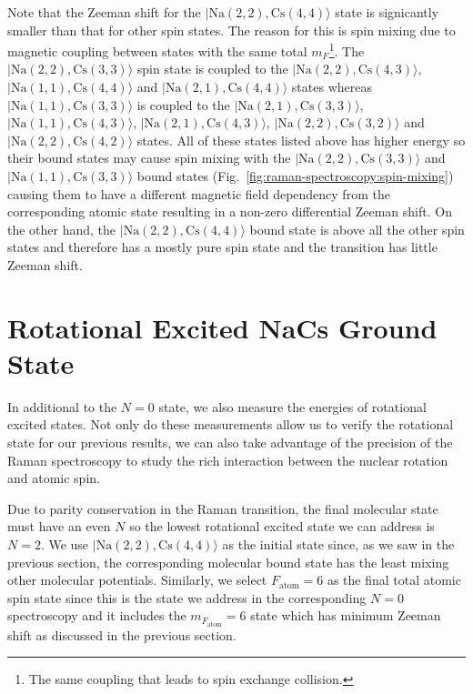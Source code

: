 Note that the Zeeman shift for the $|\mathrm{Na(2, 2),Cs(4, 4)}\rangle$ state
is signicantly smaller than that for other spin states.
The reason for this is spin mixing due to magnetic coupling between states
with the same total $m_F$\footnote{The same coupling that leads to spin exchange collision.}.
The $|\mathrm{Na(2, 2),Cs(3, 3)}\rangle$ spin state is coupled to the
$|\mathrm{Na(2, 2),Cs(4, 3)}\rangle$, $|\mathrm{Na(1, 1),Cs(4, 4)}\rangle$
and $|\mathrm{Na(2, 1),Cs(4, 4)}\rangle$ states
whereas $|\mathrm{Na(1, 1),Cs(3, 3)}\rangle$ is coupled to the
$|\mathrm{Na(2, 1),Cs(3, 3)}\rangle$, $|\mathrm{Na(1, 1),Cs(4, 3)}\rangle$,
$|\mathrm{Na(2, 1),Cs(4, 3)}\rangle$, $|\mathrm{Na(2, 2),Cs(3, 2)}\rangle$
and $|\mathrm{Na(2, 2),Cs(4, 2)}\rangle$ states.
All of these states listed above has higher energy so their bound states
may cause spin mixing with the $|\mathrm{Na(2, 2),Cs(3, 3)}\rangle$ and
$|\mathrm{Na(1, 1),Cs(3, 3)}\rangle$ bound states (Fig.~\ref{fig:raman-spectroscopy:spin-mixing})
causing them to have a different magnetic field dependency from the corresponding atomic state
resulting in a non-zero differential Zeeman shift.
On the other hand, the $|\mathrm{Na(2, 2),Cs(4, 4)}\rangle$ bound state is above
all the other spin states and therefore has a mostly pure spin state
and the transition has little Zeeman shift.

\section{Rotational Excited NaCs Ground State}
\label{ch:raman-spectroscopy:n2}

In additional to the $N=0$ state, we also measure the energies of rotational excited states.
Not only do these measurements allow us to verify the rotational state for our previous results,
we can also take advantage of the precision of the Raman spectroscopy
to study the rich interaction between the nuclear rotation and atomic spin.

Due to parity conservation in the Raman transition,
the final molecular state must have an even $N$
so the lowest rotational excited state we can address is $N=2$.
We use $|\mathrm{Na(2, 2),Cs(4, 4)}\rangle$ as the initial state since,
as we saw in the previous section, the corresponding molecular bound state
has the least mixing other molecular potentials.
Similarly, we select $F_{\mathrm{atom}}=6$ as the final total atomic spin state
since this is the state we address in the corresponding $N=0$ spectroscopy and
it includes the $m_{F_{\mathrm{atom}}}=6$ state which has minimum
Zeeman shift as discussed in the previous section.

